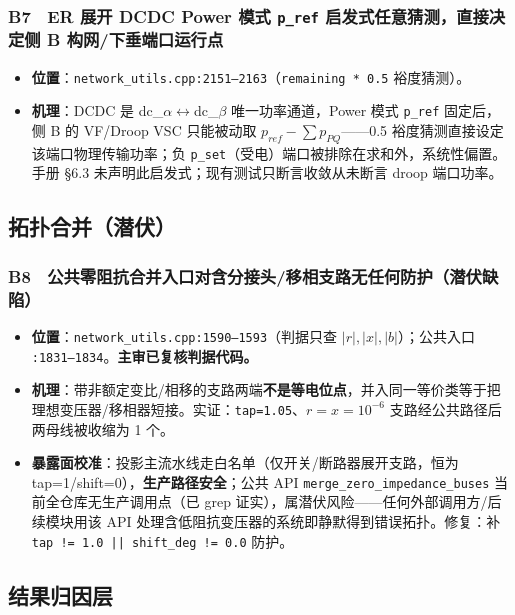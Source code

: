 \documentclass[11pt,a4paper,fontset=fandol]{ctexart}
\newcommand{\file}[1]{\texttt{#1}}
\begin{document}
\subsubsection*{B7　ER 展开 DCDC Power 模式 \texttt{p\_ref} 启发式任意猜测，直接决定侧 B 构网/下垂端口运行点}
\begin{itemize}
  \item \textbf{位置}：\file{network\_utils.cpp:2151--2163}（\texttt{remaining * 0.5} 裕度猜测）。
  \item \textbf{机理}：DCDC 是 dc\_$\alpha\leftrightarrow$dc\_$\beta$ 唯一功率通道，Power 模式 \texttt{p\_ref} 固定后，侧 B 的 VF/Droop VSC 只能被动取 $p_{ref}-\sum p_{PQ}$——0.5 裕度猜测直接设定该端口物理传输功率；负 \texttt{p\_set}（受电）端口被排除在求和外，系统性偏置。手册 \S 6.3 未声明此启发式；现有测试只断言收敛从未断言 droop 端口功率。
\end{itemize}

\subsection{拓扑合并（潜伏）}

\subsubsection*{B8　公共零阻抗合并入口对含分接头/移相支路无任何防护（潜伏缺陷）}
\begin{itemize}
  \item \textbf{位置}：\file{network\_utils.cpp:1590--1593}（判据只查 $|r|,|x|,|b|$）；公共入口 \file{:1831--1834}。\textbf{主审已复核判据代码。}
  \item \textbf{机理}：带非额定变比/相移的支路两端\textbf{不是等电位点}，并入同一等价类等于把理想变压器/移相器短接。实证：\texttt{tap=1.05}、$r=x=10^{-6}$ 支路经公共路径后两母线被收缩为 1 个。
  \item \textbf{暴露面校准}：投影主流水线走白名单（仅开关/断路器展开支路，恒为 tap=1/shift=0），\textbf{生产路径安全}；公共 API \file{merge\_zero\_impedance\_buses} 当前全仓库无生产调用点（已 grep 证实），属潜伏风险——任何外部调用方/后续模块用该 API 处理含低阻抗变压器的系统即静默得到错误拓扑。修复：补 \texttt{tap != 1.0 || shift\_deg != 0.0} 防护。
\end{itemize}

\subsection{结果归因层}
\end{document}

